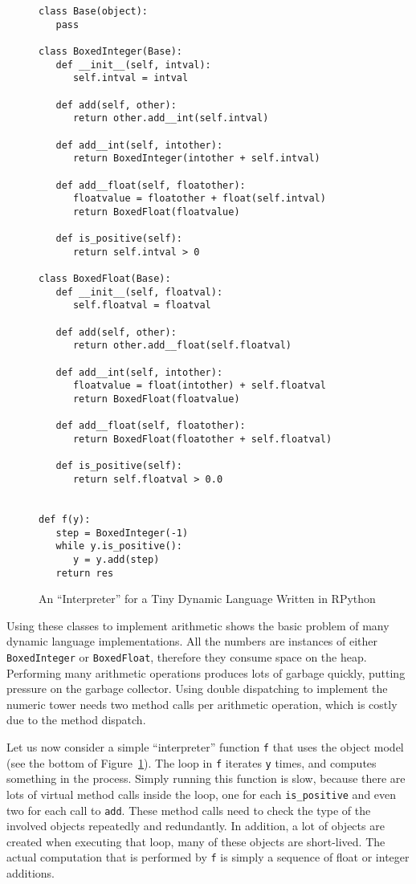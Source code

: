 \documentclass[preprint]{sigplanconf}
\begin{document}
\begin{figure}
\begin{lstlisting}[mathescape,basicstyle=\setstretch{1.05}\ttfamily\scriptsize]
class Base(object):
   pass

class BoxedInteger(Base):
   def __init__(self, intval):
      self.intval = intval

   def add(self, other):
      return other.add__int(self.intval)

   def add__int(self, intother):
      return BoxedInteger(intother + self.intval)

   def add__float(self, floatother):
      floatvalue = floatother + float(self.intval)
      return BoxedFloat(floatvalue)

   def is_positive(self):
      return self.intval > 0

class BoxedFloat(Base):
   def __init__(self, floatval):
      self.floatval = floatval

   def add(self, other):
      return other.add__float(self.floatval)

   def add__int(self, intother):
      floatvalue = float(intother) + self.floatval
      return BoxedFloat(floatvalue)

   def add__float(self, floatother):
      return BoxedFloat(floatother + self.floatval)

   def is_positive(self):
      return self.floatval > 0.0


def f(y):
   step = BoxedInteger(-1)
   while y.is_positive():
      y = y.add(step)
   return res
\end{lstlisting}
\caption{An ``Interpreter'' for a Tiny Dynamic Language Written in RPython}
\label{fig:objmodel}
\end{figure}

Using these classes to implement arithmetic shows the basic problem of many
dynamic language implementations. All the numbers are instances of either
\lstinline{BoxedInteger} or \lstinline{BoxedFloat}, therefore they consume space on the
heap. Performing many arithmetic operations produces lots of garbage quickly,
putting pressure on the garbage collector. Using double dispatching to
implement the numeric tower needs two method calls per arithmetic operation,
which is costly due to the method dispatch.

Let us now consider a simple ``interpreter'' function \lstinline{f} that uses the
object model (see the bottom of Figure~\ref{fig:objmodel}).
The loop in \lstinline{f} iterates \lstinline{y} times, and computes something in the process.
Simply running this function is slow, because there are lots of virtual method
calls inside the loop, one for each \lstinline{is_positive} and even two for each
call to \lstinline{add}. These method calls need to check the type of the involved
objects repeatedly and redundantly. In addition, a lot of objects are created
when executing that loop, many of these objects are short-lived.
The actual computation that is performed by \lstinline{f} is simply a sequence of
float or integer additions.
\end{document}

